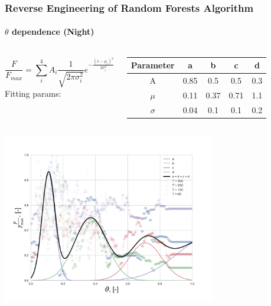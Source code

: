 \documentclass{beamer}
\begin{document}
\begin{frame}
\frametitle{Reverse Engineering of Random Forests Algorithm}
\framesubtitle{$\theta$ dependence (Night)}

\begin{columns}[t]
\tiny
{}
\begin{equation}
    \frac{F}{F_{max}} = \sum\limits^{4}_i A_i\frac{1}{\sqrt{2\pi \sigma_i^2}} e^{- \frac{(x - \mu_i)^2}{2\sigma_i^2}}
\end{equation}
\tiny
\centering
Fitting params: \\
\begin{tabular}{|c|c|c|c|c|}
 \hline
 Parameter & a    & b    & c    & d\\ \hline
 A         & 0.85  & 0.5 & 0.5  & 0.3 \\ \hline
 $\mu$     & 0.11 & 0.37 & 0.71 & 1.1 \\ \hline
 $\sigma$  & 0.04 & 0.1 & 0.1  & 0.2 \\ \hline

\end{tabular}

\end{columns}


\centering
\includegraphics[width=0.7\textwidth]{Theta_dependence_fit.png}

\end{frame}
\end{document}
